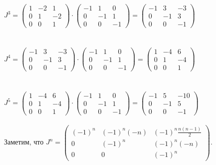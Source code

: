 \documentclass[a4paper, 12pt]{article}
\begin{document}
    \\
    \\
    \\ $J^3 = \begin{pmatrix}1 & -2 & 1\\0 & 1 & -2\\0 & 0 & 1\end{pmatrix} \cdot \begin{pmatrix}-1 & 1 & 0 \\0 & -1 & 1 \\0 & 0 & -1 \end{pmatrix} = \begin{pmatrix}-1 & 3 & -3\\0 & -1 & 3\\0 & 0 & -1\end{pmatrix}$
    \\
    \\
    \\ $J^4 = \begin{pmatrix}-1 & 3 & -3\\0 & -1 & 3\\0 & 0 & -1\end{pmatrix} \cdot \begin{pmatrix}-1 & 1 & 0 \\0 & -1 & 1 \\0 & 0 & -1 \end{pmatrix} = \begin{pmatrix}1 & -4 & 6\\0 & 1 & -4\\0 & 0 & 1\end{pmatrix}$
    \\
    \\
    \\ $J^5 = \begin{pmatrix}1 & -4 & 6\\0 & 1 & -4\\0 & 0 & 1\end{pmatrix} \cdot \begin{pmatrix}-1 & 1 & 0 \\0 & -1 & 1 \\0 & 0 & -1 \end{pmatrix} = \begin{pmatrix}-1 & 5 & -10\\0 & -1 & 5\\0 & 0 & -1\end{pmatrix}$
    \\
    \\ Заметим, что $J^n = \begin{pmatrix}(-1)^{n} & (-1)^{n}(-n) & (-1)^n\frac{n(n - 1)}{2}\\0 & (-1)^{n} & (-1)^{n}(-n)\\0 & 0 & (-1)^{n}\end{pmatrix}$.
\end{document}
